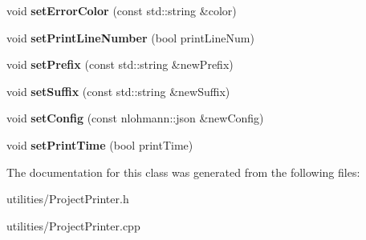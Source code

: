 \begin{DoxyCompactItemize}
\item 
\hypertarget{classProjectPrinter_a41a33969db5df74f99878f87a5502a83}{void {\bfseries set\-Error\-Color} (const std\-::string \&color)}\label{classProjectPrinter_a41a33969db5df74f99878f87a5502a83}

\item 
\hypertarget{classProjectPrinter_af10003b5af5c5aaf500d444151103e11}{void {\bfseries set\-Print\-Line\-Number} (bool print\-Line\-Num)}\label{classProjectPrinter_af10003b5af5c5aaf500d444151103e11}

\item 
\hypertarget{classProjectPrinter_afaf17899693e0e4638d4a94e487640ad}{void {\bfseries set\-Prefix} (const std\-::string \&new\-Prefix)}\label{classProjectPrinter_afaf17899693e0e4638d4a94e487640ad}

\item 
\hypertarget{classProjectPrinter_a138854bd8cf95a2535a425adc4768877}{void {\bfseries set\-Suffix} (const std\-::string \&new\-Suffix)}\label{classProjectPrinter_a138854bd8cf95a2535a425adc4768877}

\item 
\hypertarget{classProjectPrinter_a1dbbbe30f40f64a83ab3cec97ea9d47a}{void {\bfseries set\-Config} (const nlohmann\-::json \&new\-Config)}\label{classProjectPrinter_a1dbbbe30f40f64a83ab3cec97ea9d47a}

\item 
\hypertarget{classProjectPrinter_a758fe582396d7abcbd6d6534e8fb94d0}{void {\bfseries set\-Print\-Time} (bool print\-Time)}\label{classProjectPrinter_a758fe582396d7abcbd6d6534e8fb94d0}

\end{DoxyCompactItemize}


The documentation for this class was generated from the following files\-:\begin{DoxyCompactItemize}
\item 
utilities/Project\-Printer.\-h\item 
utilities/Project\-Printer.\-cpp\end{DoxyCompactItemize}
